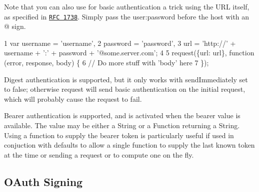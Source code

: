 Note that you can also use for basic authentication a trick using the U\+R\+L itself, as specified in \href{http://www.ietf.org/rfc/rfc1738.txt}{\tt R\+F\+C 1738}. Simply pass the {\ttfamily user\+:password} before the host with an {\ttfamily @} sign.


\begin{DoxyCode}
1 var username = 'username',
2     password = 'password',
3     url = 'http://' + username + ':' + password + '@some.server.com';
4 
5 request(\{url: url\}, function (error, response, body) \{
6    // Do more stuff with 'body' here
7 \});
\end{DoxyCode}


Digest authentication is supported, but it only works with {\ttfamily send\+Immediately} set to {\ttfamily false}; otherwise {\ttfamily request} will send basic authentication on the initial request, which will probably cause the request to fail.

Bearer authentication is supported, and is activated when the {\ttfamily bearer} value is available. The value may be either a {\ttfamily String} or a {\ttfamily Function} returning a {\ttfamily String}. Using a function to supply the bearer token is particularly useful if used in conjuction with {\ttfamily defaults} to allow a single function to supply the last known token at the time or sending a request or to compute one on the fly.

\subsection*{O\+Auth Signing}


